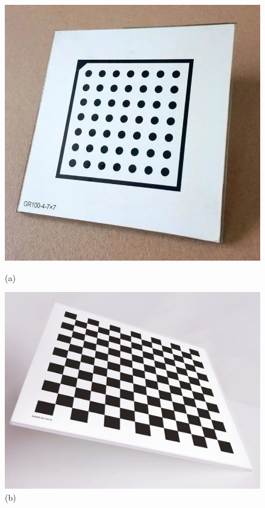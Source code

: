 \begin{figure}
	\captionsetup{list=false}

	\centering
	\includegraphics[width=\linewidth]{images/calib-dots.png}
	\caption*{(a)}
	\endminipage\hfill
	\includegraphics[width=\linewidth]{images/calib-chessb.jpg}
	\caption*{(b)}
	\endminipage\hfill

\end{figure}

